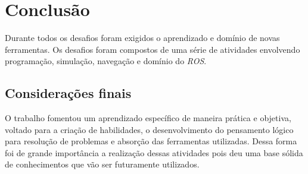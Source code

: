 \chapter{Conclusão}
\label{chap:conc}

Durante todos os desafios foram exigidos o aprendizado e domínio de novas ferramentas. Os desafios foram compostos de uma série de atividades envolvendo programação, simulação, navegação e domínio do \textit{ROS}. 



\section{Considerações finais}
\label{sec:consid}

O trabalho fomentou um aprendizado específico de maneira prática e objetiva, voltado para a criação de habilidades, o desenvolvimento do pensamento lógico para resolução de problemas e absorção das ferramentas utilizadas. Dessa forma foi de grande importância a realização dessas atividades pois deu uma base sólida de conhecimentos que vão ser futuramente utilizados.


